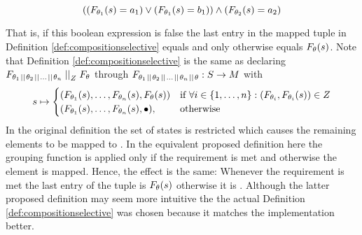 \documentclass[preview]{standalone}
\begin{document}
\[
	((\grpfct[\viewppty_1](\state) = a_1) \lor (\grpfct[\viewppty_1](\state) = b_1)) \land (\grpfct[\viewppty_2](\state) = a_2)
\]

That is, if this boolean expression is false the last entry in the mapped tuple in Definition \ref{def:compositionselective} equals \remelem and only otherwise equals $\grpfct(\state)$. Note that Definition \ref{def:compositionselective} is the same as declaring $\grpfct[{\viewppty_1 \pll \viewppty_2 \pll \dots \pll \viewppty_n}] \compselect \grpfct$ through $\grpfct[{\viewppty_1 \pll \viewppty_2 \pll \dots \pll \viewppty_n} \pll \viewppty]: \states \to \arbset$ with
\[
\state \mapsto
\begin{cases}
	(\grpfct[\viewppty_1](\state), \dots, \grpfct[\viewppty_n](\state),  \grpfct[\viewppty](\state))				& \text{if } \forall i \in \{1, \dots, n\} : (\grpfct[\viewppty_i], \grpfct[\viewppty_i](\state)) \in \compselectset \\ 		
	(\grpfct[\viewppty_1](\state), \dots, \grpfct[\viewppty_n](\state),  \remelem),          	& \text{otherwise}
\end{cases}
\]
In the original definition the set of states \smstates is restricted which causes the remaining elements to be mapped to \remelem. In the equivalent proposed definition here the grouping function is applied only if the requirement is met and otherwise the element \remelem is mapped. Hence, the effect is the same: Whenever the requirement is met the last entry of the tuple is $\grpfct(\state)$ otherwise it is \remelem. Although the latter proposed definition may seem more intuitive the the actual Definition \ref{def:compositionselective} was chosen because it matches the implementation better.
\end{document}
